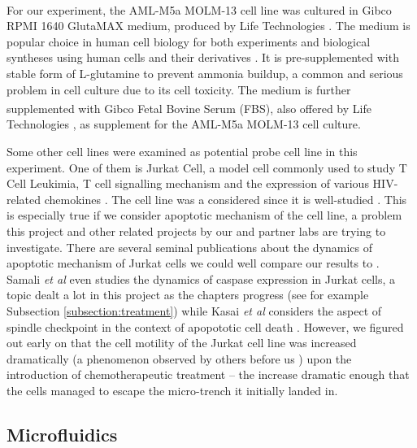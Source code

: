 \documentclass[pdftex,12pt,a4paper]{report}
\begin{document}
For our experiment, the AML-M5a MOLM-13 cell line was cultured in Gibco\textsuperscript{\textregistered} RPMI 1640 GlutaMAX medium, produced by Life Technologies \cite{gibcocellculture2017}. The medium is popular choice in human cell biology for both experiments and biological syntheses using human cells and their derivatives \cite{blight2000efficient, shimizu2002fabrication}. It is pre-supplemented with stable form of L-glutamine to prevent ammonia buildup, a common and serious problem in cell culture due to its cell toxicity\cite{satter1974effect}. The medium is further supplemented with Gibco\textsuperscript{\textregistered} Fetal Bovine Serum (FBS), also offered by Life Technologies \cite{gibcofbs2017}, as supplement for the AML-M5a MOLM-13 cell culture.

Some other cell lines were examined as potential probe cell line in this experiment. One of them is Jurkat Cell, a model cell commonly used to study T Cell Leukimia, T cell signalling mechanism and the expression of various HIV-related chemokines \cite{schneider1977characterization}. The cell line was a considered since it is well-studied \cite{johnson2007genome, schena1996parallel}. This is especially true if we consider apoptotic mechanism of the cell line, a problem this project and other related projects by our  and partner labs are trying to investigate. There are several seminal publications about the dynamics of apoptotic mechanism of Jurkat cells we could well compare our results to \cite{gottlieb1996apoptosis}. Samali \textit{et al} \cite{samali1999presence} even studies the dynamics of caspase expression in Jurkat cells, a topic dealt a lot in this project as the chapters progress (see for example Subsection \ref{subsection:treatment}) while Kasai \textit{et al} considers the aspect of spindle checkpoint in the context of apopototic cell death \cite{kasai2002prevalent}. However, we figured out early on that the cell motility of the Jurkat cell line was increased dramatically (a phenomenon observed by others before us \cite{barnhart2004cd95}) upon the introduction of chemotherapeutic treatment -- the increase dramatic enough that the cells managed to escape the micro-trench it initially landed in.


\subsection{Microfluidics}
\label{subsection:microfluid_env}

\end{document}
